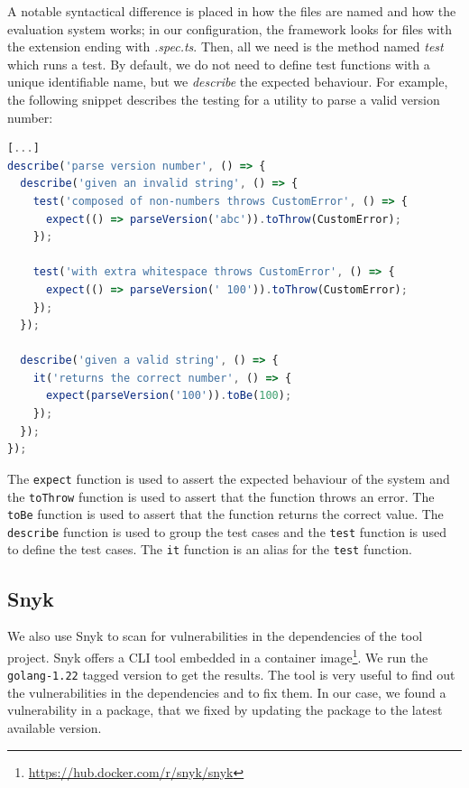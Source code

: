 A notable syntactical difference is placed in how the files are named and how the evaluation system works; in our configuration, the framework looks for files with the extension ending with \textit{.spec.ts}. Then, all we need is the method named \textit{test} which runs a test. By default, we do not need to define test functions with a unique identifiable name, but we \textit{describe} the expected behaviour. For example, the following snippet describes the testing for a utility to parse a valid version number:

\begin{lstlisting}[language=Javascript, caption={Jest testing framework example file parsing.spec.ts}]
[...]
describe('parse version number', () => {
  describe('given an invalid string', () => {
    test('composed of non-numbers throws CustomError', () => {
      expect(() => parseVersion('abc')).toThrow(CustomError);
    });

    test('with extra whitespace throws CustomError', () => {
      expect(() => parseVersion(' 100')).toThrow(CustomError);
    });
  });

  describe('given a valid string', () => {
    it('returns the correct number', () => {
      expect(parseVersion('100')).toBe(100);
    });
  });
});
\end{lstlisting}

The \texttt{expect} function is used to assert the expected behaviour of the system and the \texttt{toThrow} function is used to assert that the function throws an error. The \texttt{toBe} function is used to assert that the function returns the correct value. The \texttt{describe} function is used to group the test cases and the \texttt{test} function is used to define the test cases. The \texttt{it} function is an alias for the \texttt{test} function.

\subsection{Snyk}

We also use Snyk to scan for vulnerabilities in the dependencies of the tool project. Snyk offers a CLI tool embedded in a container image\footnote{\url{https://hub.docker.com/r/snyk/snyk}}. We run the \texttt{golang-1.22} tagged version to get the results. The tool is very useful to find out the vulnerabilities in the dependencies and to fix them. In our case, we found a vulnerability in a package, that we fixed by updating the package to the latest available version.

